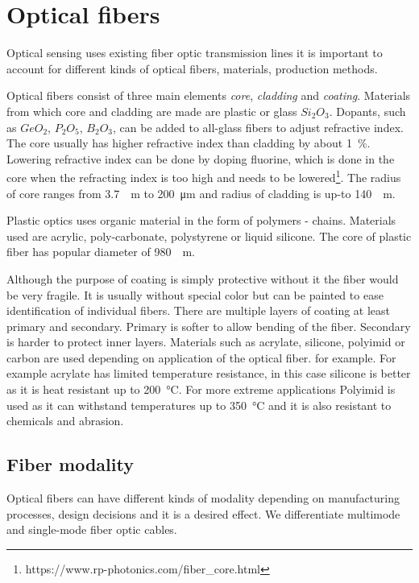 \section{Optical fibers}

Optical sensing uses existing fiber optic transmission lines it is important to account for different kinds of optical fibers, materials, production methods.

Optical fibers consist of three main elements \textit{core}, \textit{cladding} and \textit{coating}. Materials from which core and cladding are made are plastic or glass $Si_2O_3$. Dopants, such as $GeO_2$, $P_2O_5$, $B_2O_3$, can be added to all-glass fibers to adjust refractive index. The core usually has higher refractive index than cladding by about \qty{1}{\si{\percent}}. Lowering refractive index can be done by doping fluorine, which is done in the core when the refracting index is too high and needs to be lowered\footnote{https://www.rp-photonics.com/fiber\_core.html}. The radius of core ranges from \qty{3.7}{\si{\micro}\meter} to \qty{200}{\micro\meter} and radius of cladding is up-to \qty{140}{\si{\micro}\meter}\cite{}.

Plastic optics uses organic material in the form of polymers - chains. Materials used are acrylic, poly-carbonate, polystyrene or liquid silicone. The core of plastic fiber has popular diameter of \qty{980}{\si{\micro}\meter}.

Although the purpose of coating is simply protective without it the fiber would be very fragile. It is usually without special color but can be painted to ease identification of individual fibers. There are multiple layers of coating at least primary and secondary. Primary is softer to allow bending of the fiber. Secondary is harder to protect inner layers. Materials such as acrylate, silicone, polyimid or carbon are used depending on application of the optical fiber. for example. For example acrylate has limited temperature resistance, in this case silicone is better as it is heat resistant up to \qty{200}{\celsius}\cite{cabling}. For more extreme applications Polyimid is used as it can withstand temperatures up to \qty{350}{\celsius} and it is also resistant to chemicals and abrasion\cite{cabling}.

\subsection{Fiber modality}

Optical fibers can have different kinds of modality depending on manufacturing processes, design decisions and it is a desired effect. We differentiate multimode and single-mode fiber optic cables. 

